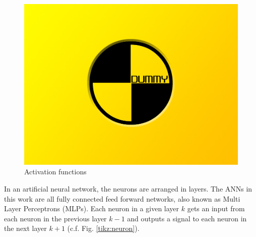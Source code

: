 \begin{figure}[h]
	\includegraphics[width=\textwidth]{src/pics/dummy.jpg}
	\caption{Activation functions \cite{Zuern2017}}
	\label{fig:activation_functions} 
\end{figure}

In an artificial neural network, the neurons are arranged in layers. The ANNs in this work are all fully connected feed forward networks, also known as Multi Layer Perceptrons (MLPs). Each neuron in a given layer $k$ gets an input from each neuron in the previous layer $k-1$ and outputs a signal to each neuron in the next layer $k+1$ (c.f. Fig. \ref{tikz:neuron}).

